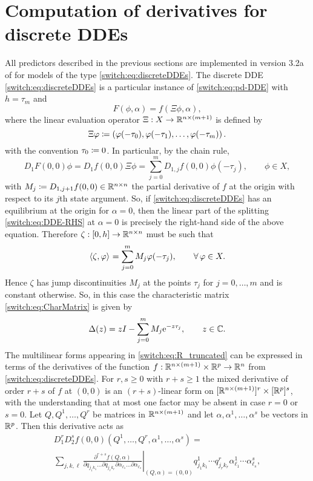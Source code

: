 \section{Computation of derivatives for discrete DDEs}
\label{switch:sec:Implement}
All predictors described in the previous sections are implemented in version 3.2a of \DDEBIFTOOL for models of the type \cref{switch:eq:discreteDDEs}. The discrete DDE \cref{switch:eq:discreteDDEs} is a particular instance of \cref{switch:eq:pd-DDE} with $h=\tau_m$ and
$$
F(\phi, \alpha) = f(\Xi \phi, \alpha),
$$
where the linear evaluation operator $\Xi: X \to \mathbb{R}^{n \times (m+1)}$ is defined by
\begin{equation}
  \label{switch:Eq:Handle}
  \Xi \varphi \coloneqq \left(\varphi(-\tau_0),\varphi(-\tau_{1}),\dots,\varphi(-\tau_{m})\right).
\end{equation}
with the convention $\tau_0 \coloneqq 0$. In particular, by the chain rule,
\[
D_1F(0,0)\phi = D_1f(0,0)\Xi\phi = \sum_{j=0}^m{D_{1,j}f(0,0)\phi(-\tau_j)}, \qquad \phi \in X,
\]
with $M_j \coloneqq D_{1,j+1}f(0,0) \in \mathbb{R}^{n \times n}$ the partial derivative of $f$ at the origin with respect to its $j$th state argument. So, if \cref{switch:eq:discreteDDEs} has an equilibrium at the origin for $\alpha = 0$, then the linear part of the splitting \cref{switch:eq:DDE-RHS} at $\alpha = 0$ is precisely the right-hand side of the above equation. Therefore $\zeta : [0,h] \to \mathbb{R}^{n \times n}$ must be such that
$$
\langle \zeta,\varphi \rangle_{} = \sum_{j=0}^m{M_j\varphi(-\tau_j)}, \qquad \forall\,\varphi \in X.
$$
Hence $\zeta$ has jump discontinuities $M_j$ at the points $\tau_j$ for $j = 0,\ldots,m$ and is constant otherwise. So, in this case the characteristic matrix \cref{switch:eq:CharMatrix} is given by
\[
\Delta(z) = z I  - \sum_{j=0}^m  M_j {\rm e}^{-z \tau_j}, \qquad z \in \mathbb{C}.
\]
The multilinear forms appearing in \cref{switch:eq:R_truncated} can be expressed in terms of the derivatives of the function  $f: \mathbb{R}^{n \times (m+1)} \times \mathbb{R}^p \to \mathbb{R}^n$ from \cref{switch:eq:discreteDDEs}. For $r, s \ge 0$ with $r + s \ge 1$ the mixed derivative of order $r + s$ of $f$ at $(0,0)$ is an $(r + s)$-linear form on $[\mathbb{R}^{n \times (m + 1)}]^r \times [\mathbb{R}^p]^s$, with the understanding that at most one factor may be absent in case $r = 0$ or $s = 0$. Let $Q, Q^{1},\ldots,Q^{r}$ be matrices in $\mathbb{R}^{n \times (m + 1)}$ and let $\alpha, \alpha^{1},\ldots,\alpha^{s}$ be vectors in $\mathbb{R}^p$. Then this derivative acts as
\begin{multline}
  \label{switch:eq:derivsf}
  D_1^r D_2^s f(0,0)(Q^1,\ldots,Q^r, \alpha^1,\ldots,\alpha^s) =\\
  \sum_{j,k,\ell} \left.\frac{\partial^{r + s} f(Q, \alpha)}{\partial q_{j_1k_1}\ldots \partial q_{j_rk_r}\partial \alpha_{\ell_1} \ldots \partial \alpha_{\ell_s}}\right|_{(Q, \alpha) = (0,0)} q^1_{j_1k_1}\cdots q^r_{j_rk_r}\alpha^1_{\ell_1}\cdots\alpha^s_{\ell_s},
\end{multline}
